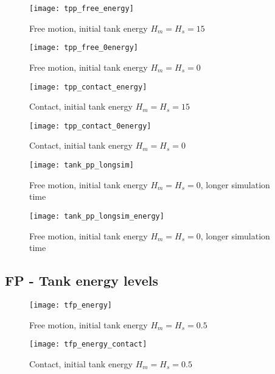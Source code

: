 \begin{figure}[H]
\begin{minipage}{0.5\textwidth}
\centering
\texttt{[image: tpp\_free\_energy]}
\caption{Free motion, initial tank energy $H_m=H_s=15$}
\medskip
\texttt{[image: tpp\_free\_0energy]}
\caption{Free motion, initial tank energy $H_m=H_s=0$}
\end{minipage}
\begin{minipage}{0.5\textwidth}
\centering
\texttt{[image: tpp\_contact\_energy]}
\caption{Contact, initial tank energy $H_m=H_s=15$}
\medskip
\texttt{[image: tpp\_contact\_0energy]}
\caption{Contact, initial tank energy $H_m=H_s=0$}
\end{minipage}
\end{figure}

\begin{figure}
\centering
\texttt{[image: tank\_pp\_longsim]}
\caption{Free motion, initial tank energy $H_m=H_s=0$, longer simulation time}
\end{figure}

\begin{figure}
\centering
\texttt{[image: tank\_pp\_longsim\_energy]}
\caption{Free motion, initial tank energy $H_m=H_s=0$, longer simulation time}
\end{figure}

\newpage

\subsection{FP - Tank energy levels}

\begin{figure}[H]
\begin{minipage}{0.5\textwidth}
\centering
\texttt{[image: tfp\_energy]}
\caption{Free motion, initial tank energy $H_m=H_s=0.5$}
\end{minipage}
\begin{minipage}{0.5\textwidth}
\centering
\texttt{[image: tfp\_energy\_contact]}
\caption{Contact, initial tank energy $H_m=H_s=0.5$}
\end{minipage}
\end{figure}
